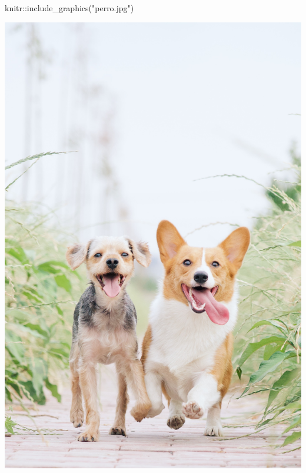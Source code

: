 \documentclass[
]{article}
\newenvironment{Shaded}{\begin{snugshade}}{\end{snugshade}}
\newcommand{\FunctionTok}[1]{\textcolor[rgb]{0.00,0.00,0.00}{#1}}
\newcommand{\NormalTok}[1]{#1}
\newcommand{\SpecialCharTok}[1]{\textcolor[rgb]{0.00,0.00,0.00}{#1}}
\newcommand{\StringTok}[1]{\textcolor[rgb]{0.31,0.60,0.02}{#1}}
\begin{document}
\hypertarget{section}{%
\subsubsection{}\label{section}}

\begin{Shaded}
\begin{Highlighting}[]
\NormalTok{knitr}\SpecialCharTok{::}\FunctionTok{include\_graphics}\NormalTok{(}\StringTok{"perro.jpg"}\NormalTok{)}
\end{Highlighting}
\end{Shaded}

\includegraphics[width=25.71in]{perro}
\end{document}
